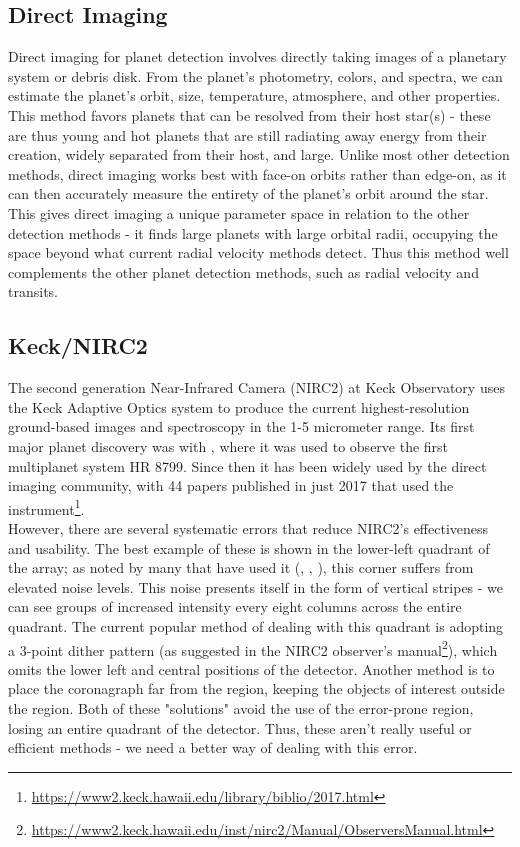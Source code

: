 \documentclass[twocolumn,longauthor]{aastex61}
\begin{document}
\subsection{Direct Imaging} \label{subsec:imaging}
\noindent Direct imaging for planet detection involves directly taking images of a planetary system or debris disk. From the planet's photometry, colors, and spectra, we can estimate the planet's orbit, size, temperature, atmosphere, and other properties. This method favors planets that can be resolved from their host star(s) - these are thus young and hot planets that are still radiating away energy from their creation, widely separated from their host, and large. Unlike most other detection methods, direct imaging works best with face-on orbits rather than edge-on, as it can then accurately measure the entirety of the planet's orbit around the star. This gives direct imaging a unique parameter space in relation to the other detection methods - it finds large planets with large orbital radii, occupying the space beyond what current radial velocity methods detect. Thus this method well complements the other planet detection methods, such as radial velocity and transits.


\subsection{Keck/NIRC2} \label{subsec:nirc2}
\noindent The second generation Near-Infrared Camera (NIRC2) at Keck Observatory uses the Keck Adaptive Optics system to produce the current highest-resolution ground-based images and spectroscopy in the 1-5 micrometer range. Its first major planet discovery was with \citet{2008Science..322..1348}, where it was used to observe the first multiplanet system HR 8799. Since then it has been widely used by the direct imaging community, with 44 papers published in just 2017 that used the instrument\footnote{\url{https://www2.keck.hawaii.edu/library/biblio/2017.html}}.\\
\indent However, there are several systematic errors that reduce NIRC2's effectiveness and usability. The best example of these is shown in the lower-left quadrant of the array; as noted by many that have used it (\citet{2015ApJS..216..53}, \citet{2017ApJ..153..255}, \citet{2017arXiv..1709.01957}), this corner suffers from elevated noise levels. This noise presents itself in the form of vertical stripes - we can see groups of increased intensity every eight columns across the entire quadrant. The current popular method of dealing with this quadrant is adopting a 3-point dither pattern (as suggested in the NIRC2 observer's manual\footnote{\url{https://www2.keck.hawaii.edu/inst/nirc2/Manual/ObserversManual.html}}), which omits the lower left and central positions of the detector. Another method is to place the coronagraph far from the region, keeping the objects of interest outside the region. Both of these "solutions" avoid the use of the error-prone region, losing an entire quadrant of the detector. Thus, these aren't really useful or efficient methods - we need a better way of dealing with this error.
\end{document}
